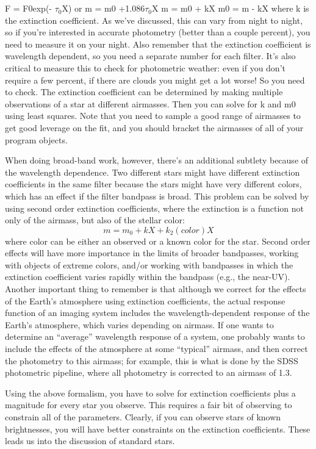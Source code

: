 \documentclass[12pt]{article}
\begin{document}
F = F0exp(- $\displaystyle \tau_{0}^{}$X)
or
m = m0 +1.086$\displaystyle \tau_{0}^{}$X
m = m0 + kX
m0 = m - kX
where k is the extinction coefficient. As we've discussed, this can
vary from night to night, so if you're interested in accurate
photometry (better than a couple percent), you need to measure it on
your night. Also remember that the extinction coefficient is
wavelength dependent, so you need a separate number for each filter.
It's also critical to measure this to check for photometric weather:
even if you don't require a few percent, if there are clouds you might
get a lot worse! So you need to check.
The extinction coefficient can be determined by making multiple
observations of a star at different airmasses. Then you can solve for
k and m0 using least squares. Note that you need to sample a good
range of airmasses to get good leverage on the fit, and you should
bracket the airmasses of all of your program objects.

When doing broad-band work, however, there's an additional subtlety
because of the wavelength dependence. Two different stars might have
different extinction coefficients in the same filter because the stars
might have very different colors, which has an effect if the filter
bandpass is broad. This problem can be solved by using second order
extinction coefficients, where the extinction is a function not only
of the airmass, but also of the stellar color:
\[
    m = m_{0} + kX + k_{2}(color)X
    \]
where color can be either an observed or a known color for the star.
Second order effects will have more importance in the limits of
broader bandpasses, working with objects of extreme colors, and/or
working with bandpasses in which the extinction coefficient varies
rapidly within the bandpass (e.g., the near-UV).
Another important thing to remember is that although we correct for
the effects of the Earth's atmosphere using extinction coefficients,
the actual response function of an imaging system includes the
wavelength-dependent response of the Earth's atmosphere, which varies
depending on airmass. If one wants to determine an ``average''
wavelength response of a system, one probably wants to include the
effects of the atmosphere at some ``typical'' airmass, and then
correct the photometry to this airmass; for example, this is what is
done by the SDSS photometric pipeline, where all photometry is
corrected to an airmass of 1.3.

Using the above formalism, you have to solve for extinction
coefficients plus a magnitude for every star you observe. This
requires a fair bit of observing to constrain all of the parameters.
Clearly, if you can observe stars of known brightnesses, you will have
better constraints on the extinction coefficients. These leads us into
the discussion of standard stars.
\end{document}
